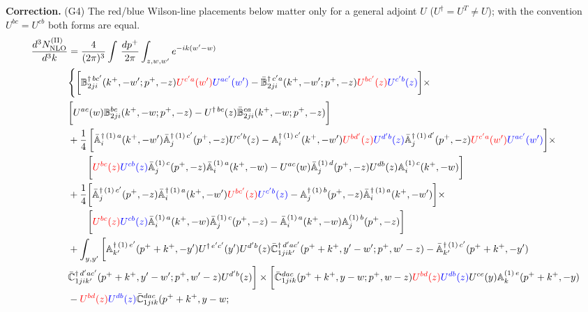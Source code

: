 \documentclass[aps,prd,amsmath,amssymb,nofootinbib]{revtex4-2}
\def\mf#1{\mathbb{#1}}
\numberwithin{equation}{section}
\begin{document}
{\color{blue}\noindent\textbf{Correction.} (G4) The red/blue Wilson-line placements below matter only for a general adjoint $U$ ($U^\dagger=U^T\neq U$); with the convention $U^{bc}=U^{cb}$ both forms are equal.}
\begin{align}\label{eq:CS2}
     \frac{d^{3}N_{\rm NLO}^{\rm (II)}}{d^{3}k} & = \frac{4}{(2\pi)^{3}} \int\, \frac{dp^{+}}{2\pi}\int_{z,w,w^{\prime}} e^{-ik(w^{\prime}-w)} \notag \\ & 
    \Bigg\{\bigg[\mf{B}^{\dagger\, bc^{\prime}}_{2ji}(k^{+},-w^{\prime};p^{+},-z)\textcolor{red}{U^{c^{\prime}a}(w^{\prime})}\textcolor{blue}{U^{ac^{\prime}}(w^{\prime})} -\Bar{\mf{B}}^{\dagger\, c^{\prime}a}_{2ji}(k^{+},-w^{\prime}; p^{+},-z)\textcolor{red}{U^{bc^{\prime}}(z)}\textcolor{blue}{U^{c^{\prime}b}(z)}\bigg]\times\notag \\ & \bigg[U^{ac}(w) \mf{B}^{bc}_{2ji}(k^{+},-w;p^{+},-z) -U^{\dagger\, bc}(z)\Bar{\mf{B}}^{ca}_{2ji}(k^{+},-w; p^{+},-z)\bigg]\notag \\ & + \frac{1}{4}\,\bigg[\Bar{\mf{A}}^{\dagger\, (1)\, a}_{i}(k^{+},-w^{\prime})\Bar{\mf{A}}^{\dagger\, (1)\, c^{\prime}}_{j}(p^{+},-z)U^{c^{\prime}b}(z)-\mf{A}^{\dagger\, (1)\, c^{\prime}}_{i}(k^{+},- w^{\prime})\textcolor{red}{U^{bd^{\prime}}(z)}\textcolor{blue}{U^{d^{\prime}b}(z)}\Bar{\mf{A}}^{\dagger\, (1)\, d^{\prime}}_{j}(p^{+},-z)\textcolor{red}{U^{c^{\prime}a}(w^{\prime})}\textcolor{blue}{U^{ac^{\prime}}(w^{\prime})}  \bigg]\times\notag \\ & \quad \quad\bigg[\textcolor{red}{U^{bc}(z)}\textcolor{blue}{U^{cb}(z)}\Bar{\mf{A}}^{(1)\, c}_{j}(p^{+},-z)\Bar{\mf{A}}^{(1)\, a}_{i}(k^{+},-w)-U^{ac}(w) \Bar{\mf{A}}^{(1)\, d}_{j}(p^{+},-z)U^{db}(z) \mf{A}^{(1)\, c}_{i}(k^{+},- w)\bigg] \notag \\ & +\frac{1}{4}\bigg[\Bar{\mf{A}}^{\dagger\,(1)\, c^{\prime}}_{j}(p^{+},-z)\Bar{\mf{A}}^{\dagger\, (1)\, a}_{i}(k^{+},- w^{\prime})\textcolor{red}{U^{bc^{\prime}}(z)}\textcolor{blue}{U^{c^{\prime}b}(z)} - \mf{A}^{\dagger\, (1)\, b}_{j}(p^{+},- z)\Bar{\mf{A}}^{\dagger\, (1)\, a}_{i}(k^{+},- w^{\prime})\bigg]\times\notag \\ & \quad \quad\bigg[\textcolor{red}{U^{bc}(z)}\textcolor{blue}{U^{cb}(z)}\Bar{\mf{A}}^{(1)\, a}_{i}(k^{+},- w)\Bar{\mf{A}}^{(1)\, c}_{j}(p^{+},-z)-\Bar{\mf{A}}^{(1)\, a}_{i}(k^{+},- w) \mf{A}^{(1)\, b}_{j}(p^{+},- z)\bigg]\notag \\ & + \int_{y,y^{\prime}}\bigg[\mf{A}^{\dagger\, (1)\,e^{\prime}}_{k^{\prime}}(p^{+}+k^{+},-y^{\prime})U^{\dagger\, e^{\prime}c^{\prime}}(y^{\prime})U^{d^{\prime}b}(z) \Bar{\mf{C}}^{\dagger\, d^{\prime}ac^{\prime}}_{1jik^{\prime}}(p^{+}+k^{+},y^{\prime}-w^{\prime}; p^{+},w^{\prime}-z)  -\Bar{\mf{A}}^{\dagger\, (1)\,c^{\prime}}_{k^{\prime}}(p^{+}+k^{+},-y^{\prime})\notag \\ & \Bar{\mf{C}}^{\dagger\, d^{\prime}ac^{\prime}}_{1jik^{\prime}}(p^{+}+k^{+},y^{\prime}-w^{\prime}; p^{+},w^{\prime}-z)U^{d^{\prime}b}(z)\bigg]\times\bigg[\Bar{\mf{C}}^{dac}_{1jik}(p^{+}+k^{+},y-w; p^{+},w-z)\textcolor{red}{U^{bd}(z)}\textcolor{blue}{U^{db}(z)}U^{ce}(y) \mf{A}^{(1)\,e}_{k}(p^{+}+k^{+},-y)\notag \\ & -\textcolor{red}{U^{bd}(z)}\textcolor{blue}{U^{db}(z)} \Bar{\mf{C}}^{dac}_{1jik}(p^{+}+k^{+},y-w; 
\end{align}
\end{document}
